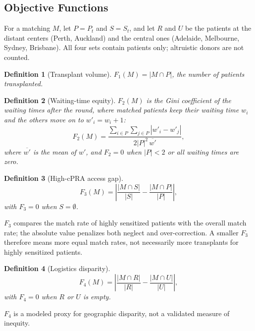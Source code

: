 \documentclass[journal]{IEEEtran}
\newtheorem{definition}{Definition}
\begin{document}
\subsection{Objective Functions}
\label{sec:problem:objectives}

For a matching $M$, let $P = P_t$ and $S = S_t$, and let $R$ and $U$
be the patients at the distant centers (Perth, Auckland) and the
central ones (Adelaide, Melbourne, Sydney, Brisbane). All four sets
contain patients only; altruistic donors are not counted.

\begin{definition}[Transplant volume]
$F_1(M) = |M \cap P|$, the number of patients transplanted.
\end{definition}

\begin{definition}[Waiting-time equity]
$F_2(M)$ is the Gini coefficient of the waiting times after the round,
where matched patients keep their waiting time $w_i$ and the others move
on to $w'_i = w_i + 1$:
\begin{equation}
  F_2(M) = \frac{\sum_{i \in P}\sum_{j \in P} |w'_i - w'_j|}
                {2 |P|^2 \, \overline{w'}} ,
  \label{eq:gini}
\end{equation}
where $\overline{w'}$ is the mean of $w'$, and $F_2 = 0$ when
$|P| < 2$ or all waiting times are zero.
\end{definition}

\begin{definition}[High-cPRA access gap]
\begin{equation}
  F_3(M) = \left| \frac{|M \cap S|}{|S|} - \frac{|M \cap P|}{|P|}
  \right| ,
  \label{eq:f3}
\end{equation}
with $F_3 = 0$ when $S = \emptyset$.
\end{definition}
$F_3$ compares the match rate of highly sensitized patients with the
overall match rate; the absolute value penalizes both neglect and
over-correction. A smaller $F_3$ therefore means more equal match
rates, not necessarily more transplants for highly sensitized
patients.

\begin{definition}[Logistics disparity]
\begin{equation}
  F_4(M) = \left| \frac{|M \cap R|}{|R|} - \frac{|M \cap U|}{|U|}
  \right| ,
  \label{eq:f4}
\end{equation}
with $F_4 = 0$ when $R$ or $U$ is empty.
\end{definition}
$F_4$ is a modeled proxy for geographic disparity, not a validated
measure of inequity.
\end{document}
